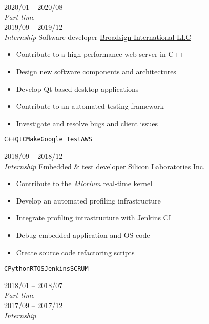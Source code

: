 \documentclass[9pt]{developercv} %
\begin{document}
\begin{minipage}[t]{0.8\textwidth}

\begin{entrylist}
	\entry
		{2020/01 -- 2020/08\\{\small\emph{Part-time}}\\2019/09 -- 2019/12\\{\small\emph{Internship}}}
		{Software developer}
		{\href{https://broadsign.com/}{Broadsign International LLC}}
		{
			\vspace{-14pt}
			\begin{itemize}
				\renewcommand{\labelitemi}{\raisebox{.45ex}{\rule{.6ex}{.6ex}}}
				\setlength\itemsep{-1pt}
				\item Contribute to a high-performance web server in C++
				\item Design new software components and architectures
				\item Develop Qt-based desktop applications
				\item Contribute to an automated testing framework
				\item Investigate and resolve bugs and client issues
			\end{itemize}
			\vspace{-4pt}
			\texttt{C++}\slashsep\texttt{Qt}\slashsep\texttt{CMake}\slashsep\texttt{Google Test}\slashsep\texttt{AWS}
		}
	\entry
		{2018/09 -- 2018/12\\{\small\emph{Internship}}}
		{Embedded \& test developer}
		{\href{https://www.silabs.com/}{Silicon Laboratories Inc.}}
		{
			\vspace{-14pt}
			\begin{itemize}
				\renewcommand{\labelitemi}{\raisebox{.45ex}{\rule{.6ex}{.6ex}}}
				\setlength\itemsep{-1pt}
				\item Contribute to the \emph{Micrium} real-time kernel
				\item Develop an automated profiling infrastructure
				\item Integrate profiling intrastructure with Jenkins CI
				\item Debug embedded application and OS code
				\item Create source code refactoring scripts
			\end{itemize}
			\vspace{-4pt}
			\texttt{C}\slashsep\texttt{Python}\slashsep\texttt{RTOS}\slashsep\texttt{Jenkins}\slashsep\texttt{SCRUM}
		}
	\entry
		{2018/01 -- 2018/07\\{\small\emph{Part-time}}\\2017/09 -- 2017/12\\{\small\emph{Internship}}}

\end{entrylist}
\end{minipage}
\end{document}
